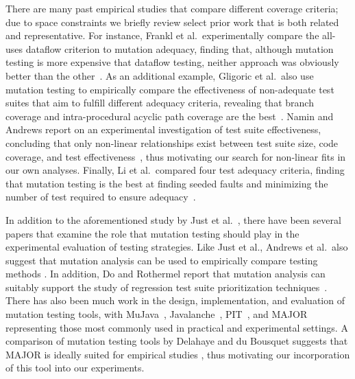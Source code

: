 There are many past empirical studies that compare different coverage criteria; due to space constraints we briefly review select prior work that is both related and representative. For instance, Frankl et al.\ experimentally compare the all-uses dataflow criterion to mutation adequacy, finding that, although mutation testing is more expensive that dataflow testing, neither approach was obviously better than the other~\cite{frankl1997}. As an additional example, Gligoric et al.\ also use mutation testing to empirically compare the effectiveness of non-adequate test suites that aim to fulfill different adequacy criteria, revealing that branch coverage and intra-procedural acyclic path coverage are the best~\cite{gligoric2013}. Namin and Andrews report on an experimental investigation of test suite effectiveness, concluding that only non-linear relationships exist between test suite size, code coverage, and test effectiveness~\cite{namin2009}, thus motivating our search for non-linear fits in our own analyses. Finally, Li et al.\ compared four test adequacy criteria, finding that mutation testing is the best at finding seeded faults and minimizing the number of test required to ensure adequacy~\cite{li2009}.


In addition to the aforementioned study by Just et al.~\cite{just2014}, there have been several papers that examine the role that mutation testing should play in the experimental evaluation of testing strategies. Like Just et al., Andrews et al.\ also suggest that mutation analysis can be used to empirically compare testing methods \cite{andrews2006}. In addition, Do and Rothermel report that mutation analysis can suitably support the study of regression test suite prioritization techniques~\cite{do2006}. There has also been much work in the design, implementation, and evaluation of mutation testing tools, with MuJava~\cite{ma2005}, Javalanche~\cite{schuler2009}, PIT~\cite{pit2014}, and MAJOR~\cite{just2011b} representing those most commonly used in practical and experimental settings. A comparison of mutation testing tools by Delahaye and du Bousquet suggests that MAJOR is ideally suited for empirical studies \cite{comparingautomatedmutationtools:2013}, thus motivating our incorporation of this tool into our experiments.

% 
